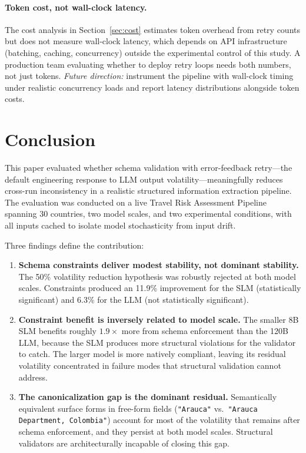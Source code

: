 \documentclass[sigconf]{acmart}
\begin{document}
\paragraph{Token cost, not wall-clock latency.} The cost analysis in Section~\ref{sec:cost} estimates token overhead from retry counts but does not measure wall-clock latency, which depends on API infrastructure (batching, caching, concurrency) outside the experimental control of this study. A production team evaluating whether to deploy retry loops needs both numbers, not just tokens. \emph{Future direction:} instrument the pipeline with wall-clock timing under realistic concurrency loads and report latency distributions alongside token costs.

\section{Conclusion}
\label{sec:conclusion}

This paper evaluated whether schema validation with error-feedback retry---the default engineering response to LLM output volatility---meaningfully reduces cross-run inconsistency in a realistic structured information extraction pipeline. The evaluation was conducted on a live Travel Risk Assessment Pipeline spanning 30 countries, two model scales, and two experimental conditions, with all inputs cached to isolate model stochasticity from input drift.

Three findings define the contribution:

\begin{enumerate}
 \item \textbf{Schema constraints deliver modest stability, not dominant stability.} The 50\% volatility reduction hypothesis was robustly rejected at both model scales. Constraints produced an 11.9\% improvement for the SLM (statistically significant) and 6.3\% for the LLM (not statistically significant).

 \item \textbf{Constraint benefit is inversely related to model scale.} The smaller 8B SLM benefits roughly $1.9\times$ more from schema enforcement than the 120B LLM, because the SLM produces more structural violations for the validator to catch. The larger model is more natively compliant, leaving its residual volatility concentrated in failure modes that structural validation cannot address.

 \item \textbf{The canonicalization gap is the dominant residual.} Semantically equivalent surface forms in free-form fields (\texttt{"Arauca"} vs.\ \texttt{"Arauca Department, Colombia"}) account for most of the volatility that remains after schema enforcement, and they persist at both model scales. Structural validators are architecturally incapable of closing this gap.
\end{enumerate}
\end{document}
